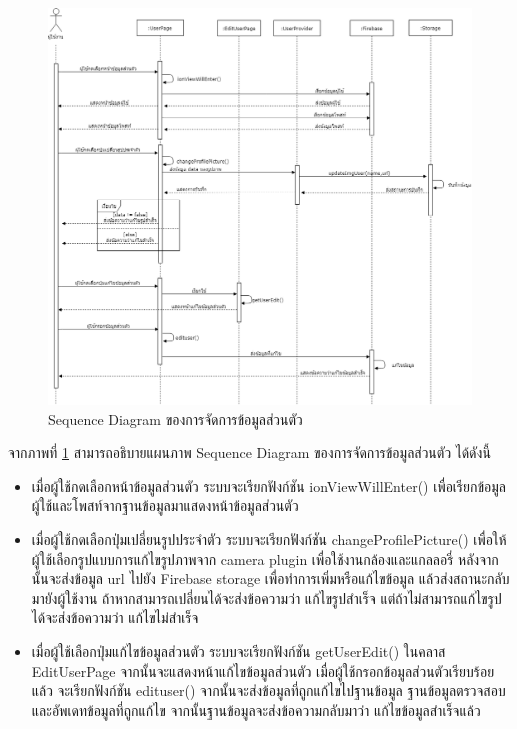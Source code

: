	\begin{figure}[H]
		\centering
		\includegraphics[width=1.0\columnwidth]
		{Figures/3/Sequence/edituser}
		\caption{Sequence Diagram ของการจัดการข้อมูลส่วนตัว}
		\label{Fig:Sequence-edituser}
	\end{figure}
	\newpage
	จากภาพที่ \ref{Fig:Sequence-edituser} สามารถอธิบายแผนภาพ Sequence Diagram ของการจัดการข้อมูลส่วนตัว ได้ดังนี้ 
	\begin{itemize}
		\item เมื่อผู้ใช้กดเลือกหน้าข้อมูลส่วนตัว ระบบจะเรียกฟังก์ชัน ionViewWillEnter() เพื่อเรียกข้อมูลผู้ใช้และโพสท์จากฐานข้อมูลมาแสดงหน้าข้อมูลส่วนตัว
		\item เมื่อผู้ใช้กดเลือกปุ่มเปลี่ยนรูปประจำตัว ระบบจะเรียกฟังก์ชัน changeProfilePicture() เพื่อให้ผู้ใช้เลือกรูปแบบการแก้ไขรูปภาพจาก camera plugin เพื่อใช้งานกล้องและแกลลอรี่ 
		หลังจากนั้นจะส่งข้อมูล url ไปยัง Firebase storage เพื่อทำการเพิ่มหรือแก้ไขข้อมูล แล้วส่งสถานะกลับมายังผู้ใช้งาน ถ้าหากสามารถเปลี่ยนได้จะส่งข้อความว่า แก้ไขรูปสำเร็จ 
		แต่ถ้าไม่สามารถแก้ไขรูปได้จะส่งข้อความว่า แก้ไขไม่สำเร็จ 
		\item เมื่อผู้ใช้เลือกปุ่มแก้ไขข้อมูลส่วนตัว ระบบจะเรียกฟังก์ชัน getUserEdit() ในคลาส EditUserPage จากนั้นจะแสดงหน้าแก้ไขข้อมูลส่วนตัว เมื่อผู้ใช้กรอกข้อมูลส่วนตัวเรียบร้อยแล้ว จะเรียกฟังก์ชัน edituser() 
		จากนั้นจะส่งข้อมูลที่ถูกแก้ไขไปฐานข้อมูล ฐานข้อมูลตรวจสอบและอัพเดทข้อมูลที่ถูกแก้ไข จากนั้นฐานข้อมูลจะส่งข้อความกลับมาว่า แก้ไขข้อมูลสำเร็จแล้ว
		\end{itemize}
\newpage	

